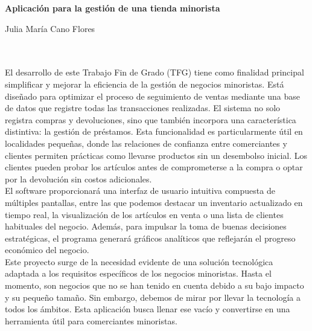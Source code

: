 


\cleardoublepage

\begin{center}
{\large\bfseries Aplicación para la gestión de una tienda minorista}\\
\end{center}
\begin{center}
Julia María Cano Flores\\
\end{center}

\vspace{0.7cm}
\\

\vspace{0.7cm}
\\

El desarrollo de este Trabajo Fin de Grado (TFG) tiene como finalidad principal simplificar y mejorar la eficiencia de la gestión de negocios minoristas. Está diseñado para optimizar el proceso de seguimiento de ventas mediante una base de datos que registre todas las transacciones realizadas. El sistema no solo registra compras y devoluciones, sino que también incorpora una característica distintiva: la gestión de préstamos. Esta funcionalidad es particularmente útil en localidades pequeñas, donde las relaciones de confianza entre comerciantes y clientes permiten prácticas como llevarse productos sin un desembolso inicial. Los clientes pueden probar los artículos antes de comprometerse a la compra o optar por la devolución sin costos adicionales.\\


El software proporcionará una interfaz de usuario intuitiva compuesta de múltiples pantallas, entre las que podemos destacar un inventario actualizado en tiempo real, la visualización de los artículos en venta o una lista de clientes habituales del negocio. Además, para impulsar la toma de buenas decisiones estratégicas, el programa generará gráficos analíticos que reflejarán el progreso económico del negocio. \\

Este proyecto surge de la necesidad evidente de una solución tecnológica adaptada a los requisitos específicos de los negocios minoristas. Hasta el momento, son negocios que no se han tenido en cuenta debido a su bajo impacto y su pequeño tamaño. Sin embargo, debemos de mirar por llevar la tecnología a todos los ámbitos. Esta aplicación busca llenar ese vacío y convertirse en una herramienta útil para comerciantes minoristas.  


